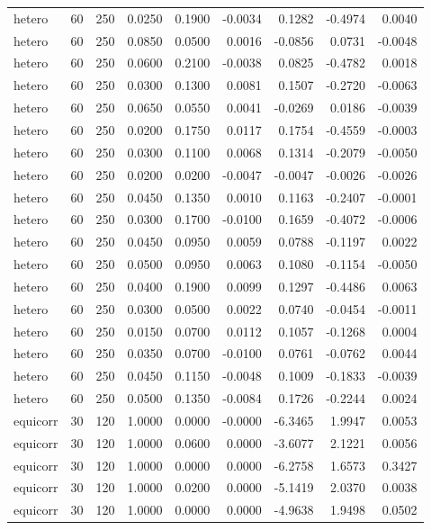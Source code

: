 \begin{tabular}{lrrrrrrrr}
hetero & 60 & 250 & 0.0250 & 0.1900 & -0.0034 & 0.1282 & -0.4974 & 0.0040 \\
hetero & 60 & 250 & 0.0850 & 0.0500 & 0.0016 & -0.0856 & 0.0731 & -0.0048 \\
hetero & 60 & 250 & 0.0600 & 0.2100 & -0.0038 & 0.0825 & -0.4782 & 0.0018 \\
hetero & 60 & 250 & 0.0300 & 0.1300 & 0.0081 & 0.1507 & -0.2720 & -0.0063 \\
hetero & 60 & 250 & 0.0650 & 0.0550 & 0.0041 & -0.0269 & 0.0186 & -0.0039 \\
hetero & 60 & 250 & 0.0200 & 0.1750 & 0.0117 & 0.1754 & -0.4559 & -0.0003 \\
hetero & 60 & 250 & 0.0300 & 0.1100 & 0.0068 & 0.1314 & -0.2079 & -0.0050 \\
hetero & 60 & 250 & 0.0200 & 0.0200 & -0.0047 & -0.0047 & -0.0026 & -0.0026 \\
hetero & 60 & 250 & 0.0450 & 0.1350 & 0.0010 & 0.1163 & -0.2407 & -0.0001 \\
hetero & 60 & 250 & 0.0300 & 0.1700 & -0.0100 & 0.1659 & -0.4072 & -0.0006 \\
hetero & 60 & 250 & 0.0450 & 0.0950 & 0.0059 & 0.0788 & -0.1197 & 0.0022 \\
hetero & 60 & 250 & 0.0500 & 0.0950 & 0.0063 & 0.1080 & -0.1154 & -0.0050 \\
hetero & 60 & 250 & 0.0400 & 0.1900 & 0.0099 & 0.1297 & -0.4486 & 0.0063 \\
hetero & 60 & 250 & 0.0300 & 0.0500 & 0.0022 & 0.0740 & -0.0454 & -0.0011 \\
hetero & 60 & 250 & 0.0150 & 0.0700 & 0.0112 & 0.1057 & -0.1268 & 0.0004 \\
hetero & 60 & 250 & 0.0350 & 0.0700 & -0.0100 & 0.0761 & -0.0762 & 0.0044 \\
hetero & 60 & 250 & 0.0450 & 0.1150 & -0.0048 & 0.1009 & -0.1833 & -0.0039 \\
hetero & 60 & 250 & 0.0500 & 0.1350 & -0.0084 & 0.1726 & -0.2244 & 0.0024 \\
equicorr & 30 & 120 & 1.0000 & 0.0000 & -0.0000 & -6.3465 & 1.9947 & 0.0053 \\
equicorr & 30 & 120 & 1.0000 & 0.0600 & 0.0000 & -3.6077 & 2.1221 & 0.0056 \\
equicorr & 30 & 120 & 1.0000 & 0.0000 & 0.0000 & -6.2758 & 1.6573 & 0.3427 \\
equicorr & 30 & 120 & 1.0000 & 0.0200 & 0.0000 & -5.1419 & 2.0370 & 0.0038 \\
equicorr & 30 & 120 & 1.0000 & 0.0000 & 0.0000 & -4.9638 & 1.9498 & 0.0502 \\

\end{tabular}
